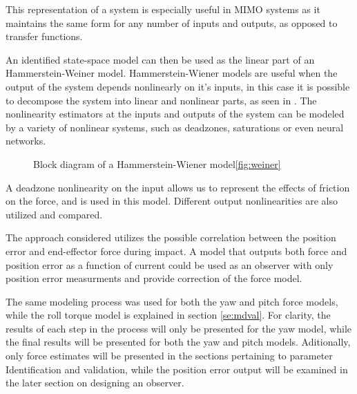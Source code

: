 This representation of a system is especially useful in MIMO systems as it maintains the same form for any number of inputs and outputs, as opposed to transfer functions.

An identified state-space model can then be used as the linear part of an Hammerstein-Weiner model.
Hammerstein-Wiener models are useful when the output of the system depends nonlinearly on it's inputs, in this case it is possible to decompose the system into linear and nonlinear parts, as seen in . 
The nonlinearity estimators at the inputs and outputs of the system can be modeled by a variety of nonlinear systems, such as deadzones, saturations or even neural networks.

\begin{figure} 
\caption{Block diagram of a Hammerstein-Wiener model\ref{fig:weiner}}
\label{weiner}
\end{figure}

A deadzone nonlinearity on the input allows us to represent the effects of friction on the force, and is used in this model.
Different output nonlinearities are also utilized and compared.

The approach considered utilizes the possible correlation between the position error and end-effector force during impact. 
A model that outputs both force and position error as a function of current could be used as an observer with only position error measurments and provide correction of the force model.

The same modeling process was used for both the yaw and pitch force models, while the roll torque model is explained in section \ref{se:mdval}.
For clarity, the results of each step in the process will only be presented for the yaw model, while the final results will be presented for both the yaw and pitch models. 
Aditionally, only force estimates will be presented in the sections pertaining to parameter Identification and validation, while the position error output will be examined in the later section on designing an observer.

